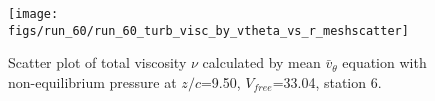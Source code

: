 \begin{figure}[H]
\centering
\texttt{[image: figs/run\_60/run\_60\_turb\_visc\_by\_vtheta\_vs\_r\_meshscatter]}
\caption{Scatter plot of total viscosity $\nu$ calculated by mean $\bar{v}_{\theta}$ equation with non-equilibrium pressure at $z/c$=9.50, $V_{free}$=33.04, station 6.}
\label{fig:run_60_turb_visc_by_vtheta_vs_r_meshscatter}
\end{figure}


